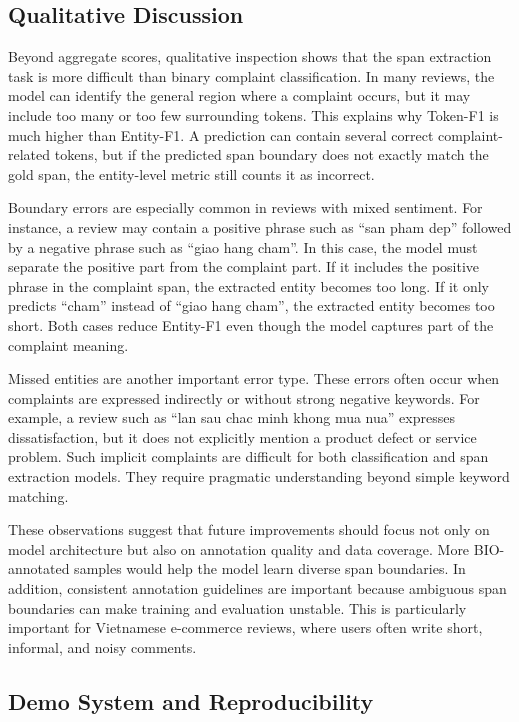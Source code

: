 \documentclass[11pt]{article}
\begin{document}
\subsection{Qualitative Discussion}

Beyond aggregate scores, qualitative inspection shows that the span extraction task is more difficult than binary complaint classification. In many reviews, the model can identify the general region where a complaint occurs, but it may include too many or too few surrounding tokens. This explains why Token-F1 is much higher than Entity-F1. A prediction can contain several correct complaint-related tokens, but if the predicted span boundary does not exactly match the gold span, the entity-level metric still counts it as incorrect.

Boundary errors are especially common in reviews with mixed sentiment. For instance, a review may contain a positive phrase such as ``san pham dep'' followed by a negative phrase such as ``giao hang cham''. In this case, the model must separate the positive part from the complaint part. If it includes the positive phrase in the complaint span, the extracted entity becomes too long. If it only predicts ``cham'' instead of ``giao hang cham'', the extracted entity becomes too short. Both cases reduce Entity-F1 even though the model captures part of the complaint meaning.

Missed entities are another important error type. These errors often occur when complaints are expressed indirectly or without strong negative keywords. For example, a review such as ``lan sau chac minh khong mua nua'' expresses dissatisfaction, but it does not explicitly mention a product defect or service problem. Such implicit complaints are difficult for both classification and span extraction models. They require pragmatic understanding beyond simple keyword matching.

These observations suggest that future improvements should focus not only on model architecture but also on annotation quality and data coverage. More BIO-annotated samples would help the model learn diverse span boundaries. In addition, consistent annotation guidelines are important because ambiguous span boundaries can make training and evaluation unstable. This is particularly important for Vietnamese e-commerce reviews, where users often write short, informal, and noisy comments.

\subsection{Demo System and Reproducibility}
\end{document}
